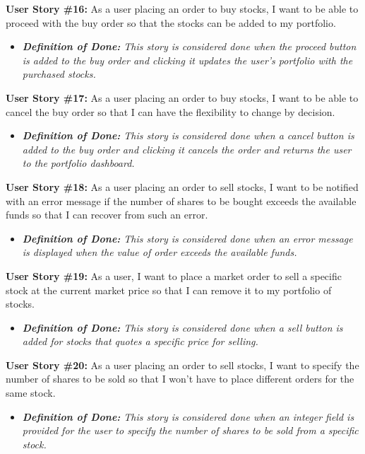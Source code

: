 \noindent \textbf{User Story \#16:} As a user placing an order to buy stocks, I want to be able to proceed with the buy order so that the stocks can be added to my portfolio.
\begin{itemize}
	\item \textit{\textbf{Definition of Done:} This story is considered done when the proceed button is added to the buy order and clicking it updates the user’s portfolio with the purchased stocks.} 
\end{itemize}

\noindent \textbf{User Story \#17:} As a user placing an order to buy stocks, I want to be able to cancel the buy order so that I can have the flexibility to change by decision.
\begin{itemize}
	\item \textit{\textbf{Definition of Done:} This story is considered done when a cancel button is added to the buy order and clicking it cancels the order and returns the user to the portfolio dashboard.} 
\end{itemize}

\noindent \textbf{User Story \#18:} As a user placing an order to sell stocks, I want to be notified with an error message if the number of shares to be bought exceeds the available funds so that I can recover from such an error.
\begin{itemize}
	\item \textit{\textbf{Definition of Done:} This story is considered done when an error message is displayed when the value of order exceeds the available funds.} 
\end{itemize}

\noindent \textbf{User Story \#19:} As a user, I want to place a market order to sell a specific stock at the current market price so that I can remove it to my portfolio of stocks.
\begin{itemize}
	\item \textit{\textbf{Definition of Done:} This story is considered done when a sell button is added for stocks that quotes a specific price for selling.} 
\end{itemize}

\noindent \textbf{User Story \#20:} As a user placing an order to sell stocks, I want to specify the number of shares to be sold so that I won’t have to place different orders for the same stock.
\begin{itemize}
	\item \textit{\textbf{Definition of Done:} This story is considered done when an integer field is provided for the user to specify the number of shares to be sold from a specific stock.} 
\end{itemize}

